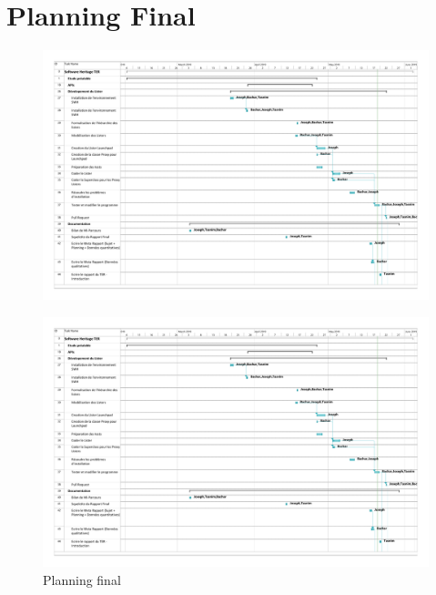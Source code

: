 \documentclass[12pt,a4paper]{report}
\begin{document}
\section{Planning Final}
\begin{figure}[!ht]
\hspace*{-3.5cm}                
\includegraphics[scale=0.48]{planning_final_summary.pdf}
\end{figure}
%
\begin{figure}[!ht]
\hspace*{-3.5cm}                
\includegraphics[scale=0.48,page=2]{planning_final_summary.pdf}
\caption{Planning final}
\end{figure}
\newpage
\end{document}
